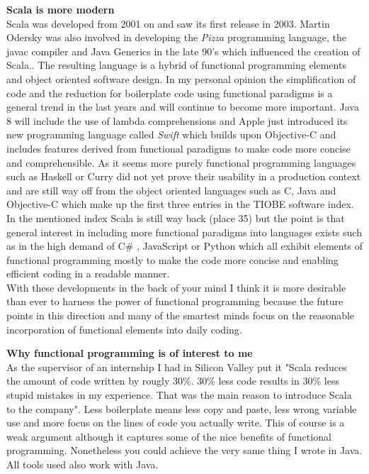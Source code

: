\documentclass[11p]{scrartcl}
\begin{document}
\textbf{Scala is more modern}\\
Scala was developed from 2001 on and saw its first release in 2003. Martin Odersky was also involved in developing the \textit{Pizza} programming language, the javac compiler and Java Generics in the late 90's which influenced the creation of Scala.\cite{link:scalaHistory}.
The resulting language is a hybrid of functional programming elements and object oriented software design. In my personal opinion the simplification of code and the reduction for boilerplate code using functional paradigms is a general trend in the last years and will continue to become more important. Java 8 will include the use of lambda comprehensions and Apple just introduced its new programming language called \textit{Swift} which builds upon Objective-C and includes features derived from functional paradigms to make code more concise and comprehensible. 
As it seems more purely functional programming languages such as Haskell or Curry did not yet prove their usability in a production context and are still way off from the object oriented languages such as C, Java and Objective-C which make up the first three entries in the TIOBE software index. \cite{link:tiobeIndex}
In the mentioned index Scala is still way back (place 35) but the point is that general interest in including more functional paradigms into languages exists such as in the high demand of C\# , JavaScript or Python which all exhibit elements of functional programming mostly to make the code more concise and enabling efficient coding in a readable manner.\\
With these developments in the back of your mind I think it is more desirable than ever to harness the power of functional programming because the future points in this direction and many of the smartest minds focus on the reasonable incorporation of functional elements into daily coding.

\textbf{Why functional programming is of interest to me}\\
As the supervisor of an internship I had in Silicon Valley put it "Scala reduces the amount of code written by rougly 30\%. 30\% less code results in 30\% less stupid mistakes in my experience. That was the main reason to introduce Scala to the company". Less boilerplate means less copy and paste, less wrong variable use and more focus on the lines of code you actually write.
This of course is a weak argument although it captures some of the nice benefits of functional programming. Nonetheless you could achieve the very same thing I wrote in Java. All tools used also work with Java.\\
\end{document}
